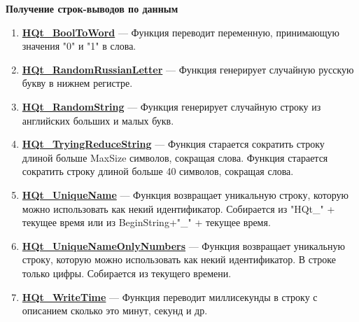 \documentclass[a4paper,12pt]{article}
\begin{document}
\textbf{Получение строк-выводов по данным}
\begin{enumerate}

\item \textbf{\hyperref[HQt_BoolToWord]{HQt\_BoolToWord}} --- Функция переводит переменную, принимающую значения "0" и "1" в слова.

\item \textbf{\hyperref[HQt_RandomRussianLetter]{HQt\_RandomRussianLetter}} --- Функция генерирует случайную русскую букву в нижнем регистре.

\item \textbf{\hyperref[HQt_RandomString]{HQt\_RandomString}} --- Функция генерирует случайную строку из английских больших и малых букв.

\item \textbf{\hyperref[HQt_TryingReduceString]{HQt\_TryingReduceString}} --- Функция старается сократить строку длиной больше MaxSize символов, сокращая слова. Функция старается сократить строку длиной больше 40 символов, сокращая слова.

\item \textbf{\hyperref[HQt_UniqueName]{HQt\_UniqueName}} --- Функция возвращает уникальную строку, которую можно использовать как некий идентификатор. Собирается из "HQt\_" + текущее время или из BeginString+"\_" + текущее время.

\item \textbf{\hyperref[HQt_UniqueNameOnlyNumbers]{HQt\_UniqueNameOnlyNumbers}} --- Функция возвращает уникальную строку, которую можно использовать как некий идентификатор. В строке только цифры. Собирается из текущего времени.

\item \textbf{\hyperref[HQt_WriteTime]{HQt\_WriteTime}} --- Функция переводит миллисекунды в строку с описанием сколько это минут, секунд и др.

\end{enumerate}
\end{document}
